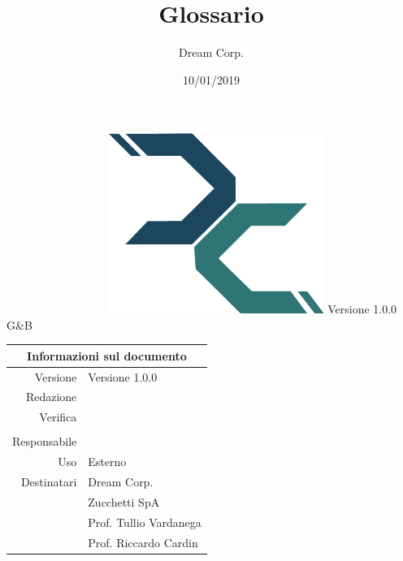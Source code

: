 \documentclass[12pt]{article}
\title{\fontsize{40}{40}\selectfont Glossario}
\author{Dream Corp.}
\date{10/01/2019}
\newcommand{\red}{\daL}
\newcommand{\verp}{\mic}
\newcommand{\vers}{\gia}
\newcommand{\res}{\daL}
\newcommand{\version}{Versione 1.0.0}
\newcommand{\use}{Esterno}
\begin{document}
    
\maketitle
\begin{center}
	~~~~~~~~~~~~~~~~~~\includegraphics[width = 70mm]{logo.png}\newline
	\huge \version 
	\\G\&B
	
	\begin{table}[h!]
		\centering
		\begin{tabular}{r|l}
			\multicolumn{2}{c}{Informazioni sul documento}\\
			\hline
			Versione & \version \\
			Redazione & \red \\
			Verifica & \verp\\
			& \vers\\
			Responsabile & \res\\
			Uso & \use\\
			Destinatari & Dream Corp. \\
			& Zucchetti SpA\\
			& Prof. Tullio Vardanega\\
			& Prof. Riccardo Cardin\\
		\end{tabular}
	\end{table}
	
\end{center}
\newpage

    \clearpage
    \glsaddall

    \printglossary[title=Glossario,toctitle=Glossario,nonumberlist]
\end{document}
